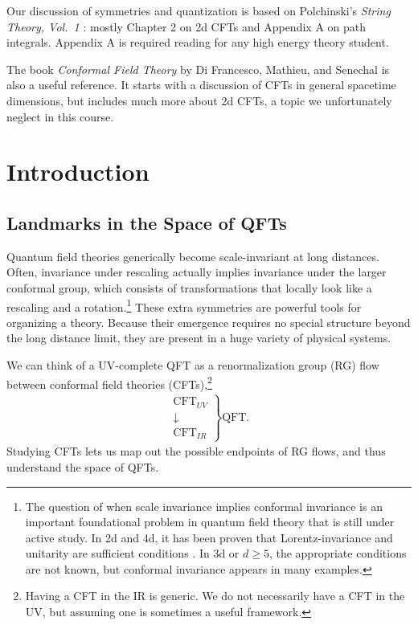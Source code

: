 \documentclass{ws-rv9x6}
\newif\ifarxivsubmission
\newcommand\be{\begin{eqnarray}}
\newcommand\ee{\end{eqnarray}}
\newcommand\<\langle
\renewcommand\>\rangle
\renewcommand\.{\cdot}
\begin{document}
Our discussion of symmetries and quantization is based on Polchinski's {\it String Theory, Vol.\ 1} \cite{Polchinski:1998rq}: mostly Chapter 2 on 2d CFTs and Appendix A on path integrals.  Appendix A is required reading for any high energy theory student.

The book {\it Conformal Field Theory\/} by Di Francesco, Mathieu, and Senechal \cite{YellowPages} is also a useful reference. It starts with a discussion of CFTs in general spacetime dimensions, but includes much more about 2d CFTs, a topic we unfortunately neglect in this course.

\ifarxivsubmission
  \newpage
\fi

\section{Introduction}

\subsection{Landmarks in the Space of QFTs}

Quantum field theories generically become scale-invariant at long distances. Often, invariance under rescaling actually implies invariance under the larger conformal group, which consists of transformations that locally look like a rescaling and a rotation.\footnote{The question of when scale invariance implies conformal invariance is an important foundational problem in quantum field theory that is still under active study.  In 2d and 4d, it has been proven that Lorentz-invariance and unitarity are sufficient conditions \cite{Polchinski:1987dy,Dymarsky:2013pqa}.  In 3d or $d\geq 5$, the appropriate conditions are not known, but conformal invariance appears in many examples.}  These extra symmetries are powerful tools for organizing a theory. Because their emergence requires no special structure beyond the long distance limit, they are present in a huge variety of physical systems.

We can think of a UV-complete QFT as a renormalization group (RG) flow between conformal field theories (CFTs),\footnote{Having a CFT in the IR is generic.  We do not necessarily have a CFT in the UV, but assuming one is sometimes a useful framework.}
\be
\left.
\begin{array}{c}
\mathrm{CFT}_{UV}\\
\downarrow\\
\mathrm{CFT}_{IR}
\end{array}\right\} \mathrm{QFT}.
\ee
Studying CFTs lets us map out the possible endpoints of RG flows, and thus understand the space of QFTs.
\end{document}
